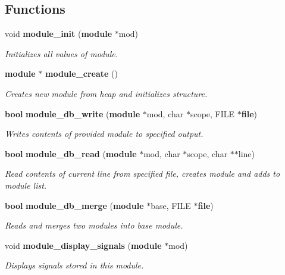 \subsection*{Functions}
\begin{CompactItemize}
\item 
void {\bf module\_\-init} ({\bf module} $\ast$mod)
\begin{CompactList}\small\item\em Initializes all values of module.\item\end{CompactList}\item 
{\bf module} $\ast$ {\bf module\_\-create} ()
\begin{CompactList}\small\item\em Creates new module from heap and initializes structure.\item\end{CompactList}\item 
{\bf bool} {\bf module\_\-db\_\-write} ({\bf module} $\ast$mod, char $\ast$scope, FILE $\ast${\bf file})
\begin{CompactList}\small\item\em Writes contents of provided module to specified output.\item\end{CompactList}\item 
{\bf bool} {\bf module\_\-db\_\-read} ({\bf module} $\ast$mod, char $\ast$scope, char $\ast$$\ast$line)
\begin{CompactList}\small\item\em Read contents of current line from specified file, creates module and adds to module list.\item\end{CompactList}\item 
{\bf bool} {\bf module\_\-db\_\-merge} ({\bf module} $\ast$base, FILE $\ast${\bf file})
\begin{CompactList}\small\item\em Reads and merges two modules into base module.\item\end{CompactList}\item 
void {\bf module\_\-display\_\-signals} ({\bf module} $\ast$mod)
\begin{CompactList}\small\item\em Displays signals stored in this module.\item\end{CompactList}\item 
$$
\end{CompactItemize}

